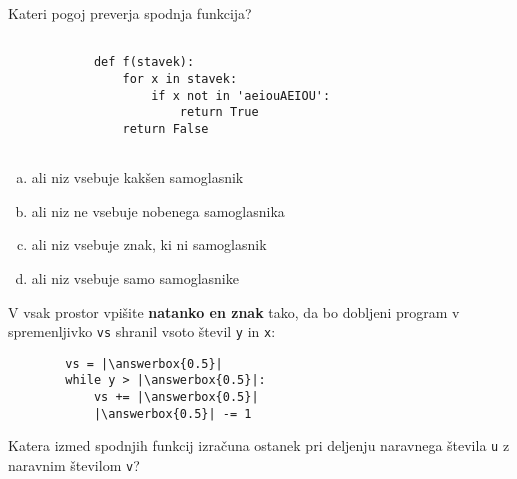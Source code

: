 \documentclass[arhiv, 10pt]{../izpit}
\newcommand{\inlinepy}[1]{\texttt{#1}}
\newcommand{\answerbox}[1]{\framebox{\vphantom{\large M}\hspace{#1cm}}}
\begin{document}
        \naloga*

        \begin{multicols}{2}
        \noindent
        Kateri pogoj preverja spodnja funkcija?
        \begin{verbatim}
        
            def f(stavek):
                for x in stavek:
                    if x not in 'aeiouAEIOU':
                        return True
                return False
            
        \end{verbatim}

        \begin{enumerate}[(a)]
\item ali niz vsebuje kakšen samoglasnik
\item ali niz ne vsebuje nobenega samoglasnika
\item ali niz vsebuje znak, ki ni samoglasnik
\item ali niz vsebuje samo samoglasnike
\end{enumerate}

        \end{multicols}
    
        \naloga*
        \begin{multicols}{2}
        \noindent
        V vsak prostor vpišite \textbf{natanko en znak} tako, da bo dobljeni program v spremenljivko \inlinepy{vs} shranil vsoto števil \inlinepy{y} in \inlinepy{x}:
        
        \columnbreak
        \begin{verbatim}
        vs = |\answerbox{0.5}|
        while y > |\answerbox{0.5}|:
            vs += |\answerbox{0.5}|
            |\answerbox{0.5}| -= 1
        \end{verbatim}
        \end{multicols}
    
        \clearpage
        \naloga
        
        Katera izmed spodnjih funkcij izračuna ostanek pri deljenju naravnega števila \inlinepy{u} z naravnim številom \inlinepy{v}?
    
\end{document}
